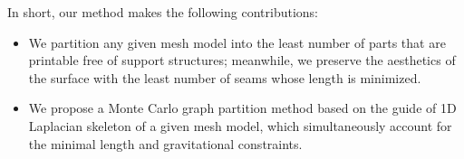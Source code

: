 In short, our method makes the following contributions:

\begin{itemize}
\item {We partition any given mesh model into the least number of parts that are printable free of support structures; meanwhile, we preserve the aesthetics of the surface with the least number of seams whose length is minimized.}
\item {We propose a Monte Carlo graph partition method based on the guide of 1D Laplacian skeleton of a given mesh model, which simultaneously account for the minimal length and gravitational constraints.}
\end{itemize}
